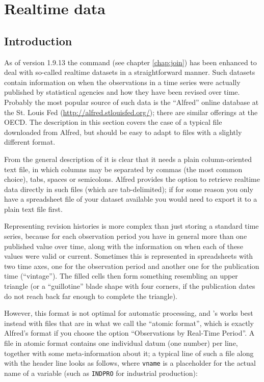 \chapter{Realtime data}
\label{chap:realtime}

\section{Introduction}
\label{sec:realtime-intro}

As of  version 1.9.13 the  command (see chapter
\ref{chap:join}) has been enhanced to deal with so-called realtime
datasets in a straightforward manner.  Such datasets contain
information on when the observations in a time series were actually
published by statistical agencies and how they have been revised over
time. Probably the most popular source of such data is the ``Alfred''
online database at the St. Louis Fed
(\url{http://alfred.stlouisfed.org/}); there are similar offerings at
the OECD.  The description in this section covers the case of a
typical file downloaded from Alfred, but should be easy to adapt to
files with a slightly different format.

From the general description of  it is clear that it needs a
plain column-oriented text file, in which columns may be separated by
commas (the most common choice), tabs, spaces or semicolons. Alfred
provides the option to retrieve realtime data directly in such files
(which are tab-delimited); if for some reason you only have a
spreadsheet file of your dataset available you would need to export it
to a plain text file first.

Representing revision histories is more complex than just storing a
standard time series, because for each observation period you have in
general more than one published value over time, along with the
information on when each of these values were valid or
current. Sometimes this is represented in spreadsheets with two time
axes, one for the observation period and another one for the
publication time (``vintage''). The filled cells then form something
resembling an upper triangle (or a ``guillotine'' blade shape with
four corners, if the publication dates do not reach back far enough to
complete the triangle).

However, this format is not optimal for automatic processing, and
's  works best instead with files that are in
what we call the ``atomic format'', which is exactly Alfred's format
if you choose the option ``Observations by Real-Time Period''. A file
in atomic format contains one individual datum (one number) per line,
together with some meta-information about it; a typical line of such a
file along with the header line looks as follows, where \texttt{vname} is a
placeholder for the actual name of a variable (such as \texttt{INDPRO}
for industrial production):

